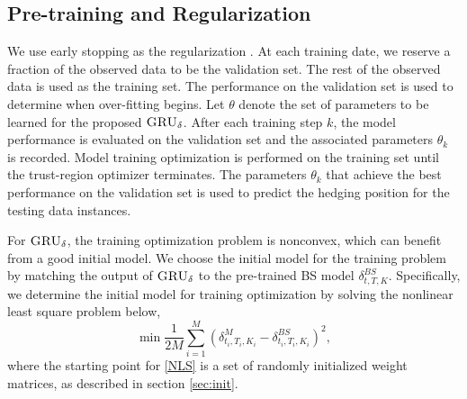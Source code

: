 \documentclass[letterpaper,12pt,titlepage,oneside,final]{book}
\numberwithin{equation}{section}
\theoremstyle{definition}
\newcommand{\model}{\textsc{GRU}_\delta}
\begin{document}
\subsection{Pre-training and  Regularization} \label{sec:preT}
We use  early stopping as the regularization \citep{raskutti2014early}.
At each training date, we reserve a fraction of the observed data to be the validation set. The rest of the observed data is used as the training set. The performance on the validation set is used to determine when over-fitting begins. Let $\theta$ denote the set of parameters to be learned for the proposed $\model$. After each training step $k$,  the model performance is evaluated on the validation set and the associated parameters $\theta_k$ is recorded.  Model training optimization is performed on the training set until the trust-region optimizer terminates. The parameters   $\theta_k$ that achieve the best performance on the validation set  is used to predict the hedging position for the testing data instances.

For $\model$,  the training optimization problem  is nonconvex,   which can benefit from a good initial model.   We choose the initial model for the training  problem  by matching  the output of $\model$ to  the pre-trained BS model  $\delta^{BS}_{t,T,K}$.  Specifically,  we determine the initial model for training optimization by solving the nonlinear least square problem below,
\begin{equation}\label{NLS}
\min \frac{1}{2M} \sum_{i=1}^{M} ( \delta^M_{t_i,T_i,K_i} -\delta^{BS}_{t_i,T_i,K_i})^2,
\end{equation}
where the starting point for \eqref{NLS} is a set of randomly initialized  weight matrices, as described in section \ref{sec:init}.
\end{document}
